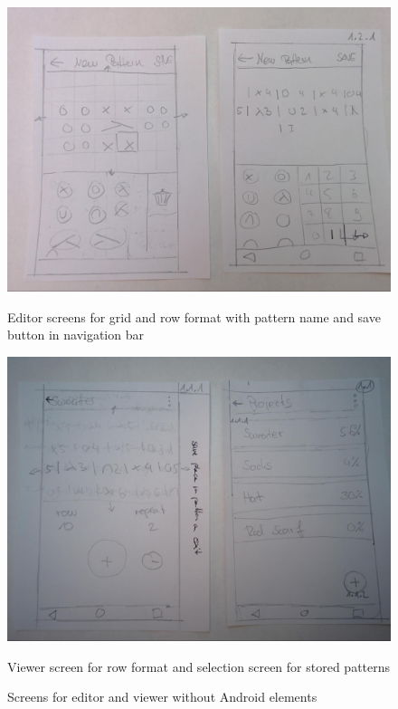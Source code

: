 \begin{figure}
  \centering
  \begin{minipage}{1\textwidth}
    \centering
    \includegraphics[width=1\linewidth]{images/image09.jpg}
    \caption{Editor screens for grid and row format with pattern name and save button in navigation bar}
    \label{fig_wireframe1}
  \end{minipage}

  \begin{minipage}{1\textwidth}
    \centering
    \includegraphics[width=1\linewidth]{images/image08.jpg}
    \caption{Viewer screen for row format and selection screen for stored patterns}
    \label{fig_wireframe2}
  \end{minipage}

  \caption{Screens for editor and viewer without Android elements}
\end{figure}

